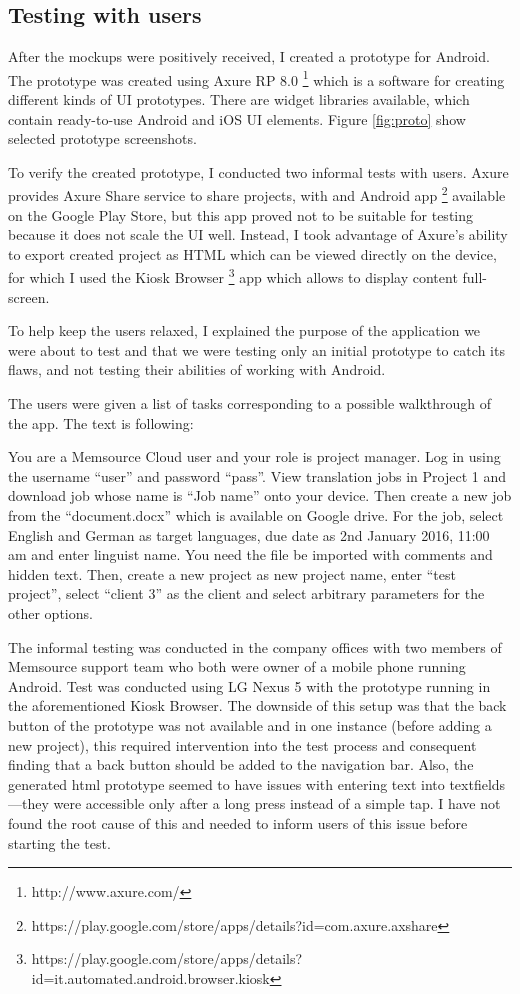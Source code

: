 \subsection{Testing with users}

After the mockups were positively received, I created a prototype for Android. The prototype was created using Axure RP 8.0 \footnote{http://www.axure.com/} which is a software for creating different kinds of UI prototypes. There are widget libraries available, which contain ready-to-use Android and iOS UI elements. Figure \ref{fig:proto} show selected prototype screenshots.

To verify the created prototype, I conducted two informal tests with users. Axure provides Axure Share service to share projects, with and Android app \footnote{https://play.google.com/store/apps/details?id=com.axure.axshare} available on the Google Play Store, but this app proved not to be suitable for testing because it does not scale the UI well. Instead, I took advantage of Axure's ability to export created project as HTML which can be viewed directly on the device, for which I used the Kiosk Browser \footnote{https://play.google.com/store/apps/details?id=it.automated.android.browser.kiosk} app which allows to display content full-screen. 

To help keep the users relaxed, I explained the purpose of the application we were about to test and that we were testing only an initial prototype to catch its flaws, and not testing their abilities of working with Android.

The users were given a list of tasks corresponding to a possible walkthrough of the app. The text is following: 

You are a Memsource Cloud user and your role is project manager. Log in using the username ``user'' and password ``pass''. View translation jobs in Project 1 and download job whose name is ``Job name'' onto your device. Then create a new job from the ``document.docx'' which is available on Google drive. For the job, select English and German as target languages, due date as 2nd January 2016, 11:00 am and enter linguist name. You need the file be imported with comments and hidden text. Then, create a new project as new project name, enter ``test project'', select ``client 3'' as the client and select arbitrary parameters for the other options.

The informal testing was conducted in the company offices with two members of Memsource support team who both were owner of a mobile phone running Android. Test was conducted using LG Nexus 5 with the prototype running in the aforementioned Kiosk Browser. The downside of this setup was that the back button of the prototype was not available and in one instance (before adding a new project), this required intervention into the test process and consequent finding that a back button should be added to the navigation bar. Also, the generated html prototype seemed to have issues with entering text into textfields---they were accessible only after a long press instead of a simple tap. I have not found the root cause of this and needed to inform users of this issue before starting the test.

